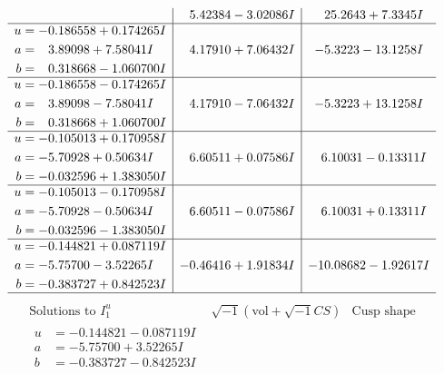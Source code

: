 \documentclass[1p]{elsarticle_modified}
\theoremstyle{definition}
\newcommand{\I}{\sqrt{-1}}
\begin{document}
$$\begin{array}{c|c|c}
 & \phantom{-}5.42384 - 3.02086 I & \phantom{-}25.2643 + 7.3345 I \\ \hline\begin{aligned}
u &= -0.186558 + 0.174265 I \\
a &= \phantom{-}3.89098 + 7.58041 I \\
b &= \phantom{-}0.318668 - 1.060700 I\end{aligned}
 & \phantom{-}4.17910 + 7.06432 I & -5.3223 - 13.1258 I \\ \hline\begin{aligned}
u &= -0.186558 - 0.174265 I \\
a &= \phantom{-}3.89098 - 7.58041 I \\
b &= \phantom{-}0.318668 + 1.060700 I\end{aligned}
 & \phantom{-}4.17910 - 7.06432 I & -5.3223 + 13.1258 I \\ \hline\begin{aligned}
u &= -0.105013 + 0.170958 I \\
a &= -5.70928 + 0.50634 I \\
b &= -0.032596 + 1.383050 I\end{aligned}
 & \phantom{-}6.60511 + 0.07586 I & \phantom{-}6.10031 - 0.13311 I \\ \hline\begin{aligned}
u &= -0.105013 - 0.170958 I \\
a &= -5.70928 - 0.50634 I \\
b &= -0.032596 - 1.383050 I\end{aligned}
 & \phantom{-}6.60511 - 0.07586 I & \phantom{-}6.10031 + 0.13311 I \\ \hline\begin{aligned}
u &= -0.144821 + 0.087119 I \\
a &= -5.75700 - 3.52265 I \\
b &= -0.383727 + 0.842523 I\end{aligned}
 & -0.46416 + 1.91834 I & -10.08682 - 1.92617 I\\
 \hline 
 \end{array}$$\newpage$$\begin{array}{c|c|c}  
\text{Solutions to }I^u_{1}& \I (\text{vol} + \sqrt{-1}CS) & \text{Cusp shape}\\
 \hline 
\begin{aligned}
u &= -0.144821 - 0.087119 I \\
a &= -5.75700 + 3.52265 I \\
b &= -0.383727 - 0.842523 I\end{aligned}

\end{array}$$
\end{document}
